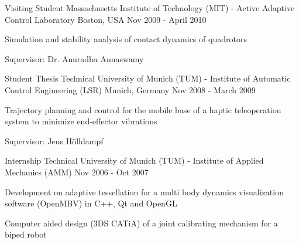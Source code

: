 \begin{cventries}
  \cventry
    {Visiting Student} %
    {Massachusetts Institute of Technology (MIT) -  Active Adaptive Control Laboratory} %
    {Boston, USA} %
    {Nov 2009 - April 2010} %
    {
      \begin{cvitems} %
        \item {Simulation and stability analysis of contact dynamics of quadrotors}
        \item {Supervisor: Dr. Anuradha Annaswamy}
      \end{cvitems}
    }

  \cventry
    {Student Thesis} %
    {Technical University of Munich (TUM) -  Institute of  Automatic Control Engineering (LSR)} %
    {Munich, Germany} %
    {Nov 2008 - March 2009} %
    {
      \begin{cvitems} %
        \item {Trajectory planning and control for the mobile base of a haptic teleoperation system to minimize end-effector vibrations}
        \item {Supervisor: Jens Hölldampf}
      \end{cvitems}
    }

  \cventry
    {Internship} %
    {Technical University of Munich (TUM) -  Institute of Applied Mechanics (AMM)} %
    { } %
    {Nov 2006 - Oct 2007} %
    {
      \begin{cvitems} %
        \item {Development on adaptive tessellation for a multi body dynamics visualization software (OpenMBV) in C++, Qt and OpenGL}
        \item {Computer aided design (3DS CATiA) of a joint calibrating mechanism for a biped robot}       
      \end{cvitems}
    }



\end{cventries}
